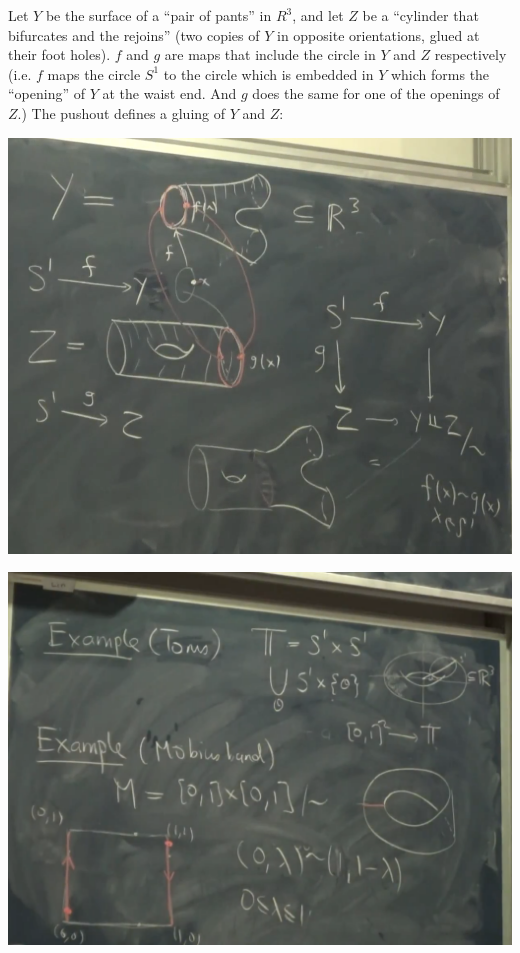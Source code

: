 \begin{example}
  Let $Y$ be the surface of a ``pair of pants​'' in $R^3$, and let $Z$ be a ``cylinder that bifurcates
  and the rejoins​'' (two copies of $Y$ in opposite orientations, glued at their foot holes). $f$
  and $g$ are maps that include the circle in $Y$ and $Z$ respectively (i.e. $f$ maps the
  circle $S^1$ to the circle which is embedded in $Y$ which forms the ``opening​'' of $Y$ at the waist
  end. And $g$ does the same for one of the openings of $Z$.) The pushout defines a gluing of $Y$
  and $Z$:
\begin{mdframed}
\includegraphics[width=400pt]{img/analysis--berkeley-202a-topology-889a.png}
\end{mdframed}
\end{example}

\begin{example}
\begin{mdframed}
\includegraphics[width=400pt]{img/analysis--berkeley-202a-topology-9b96.png}
\end{mdframed}
\end{example}


